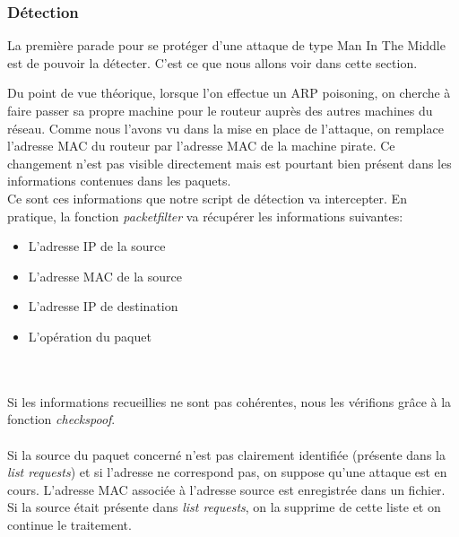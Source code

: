 \documentclass[11pt]{article}
\begin{document}
\subsubsection{Détection}

La première parade pour se protéger d'une attaque de type Man In The Middle est de pouvoir la détecter. C'est ce que nous allons voir dans cette section. 

Du point de vue théorique, lorsque l'on effectue un ARP poisoning, on cherche à faire passer sa propre machine pour le routeur auprès des autres machines du réseau. Comme nous l'avons vu dans la mise en place de l'attaque, on remplace l'adresse MAC du routeur par l'adresse MAC de la machine pirate. Ce changement n'est pas visible directement mais est pourtant bien présent dans les informations contenues dans les paquets. ~\\
Ce sont ces informations que notre script de détection va intercepter. En pratique, la fonction \textit{packetfilter} va récupérer les informations suivantes: ~\\
\begin{itemize}
	\item L'adresse IP de la source
	\item L'adresse MAC de la source
	\item L'adresse IP de destination
	\item L'opération du paquet
\end{itemize} ~\\
~\\

Si les informations recueillies ne sont pas cohérentes, nous les vérifions grâce à la fonction \textit{checkspoof}. ~\\
~\\

Si la source du paquet concerné n'est pas clairement identifiée (présente dans la \textit{list requests}) et si l'adresse ne correspond pas, on suppose qu'une attaque est en cours. L'adresse MAC associée à l'adresse source est enregistrée dans un fichier.
Si la source était présente dans \textit{list requests}, on la supprime de cette liste et on continue le traitement.~\\
~\\
\end{document}
